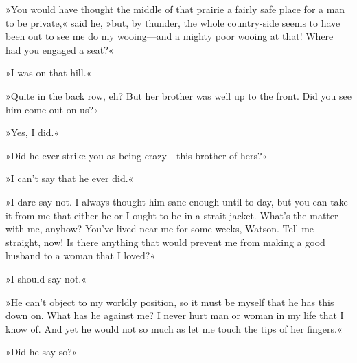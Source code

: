 »You would have thought the middle of that prairie a fairly safe place for a man to be private,« said he, »but, by thunder, the whole country-side seems to have been out to see me do my wooing\allowbreak---\allowbreak and a mighty poor wooing at that! Where had you engaged a seat?«

»I was on that hill.«

»Quite in the back row, eh? But her brother was well up to the front. Did you see him come out on us?«

»Yes, I did.«

»Did he ever strike you as being crazy\allowbreak---\allowbreak this brother of hers?«

»I can't say that he ever did.«

»I dare say not. I always thought him sane enough until to-day, but you can take it from me that either he or I ought to be in a strait-jacket. What's the matter with me, anyhow? You've lived near me for some weeks, Watson. Tell me straight, now! Is there anything that would prevent me from making a good husband to a woman that I loved?«

»I should say not.«

»He can't object to my worldly position, so it must be myself that he has this down on. What has he against me? I never hurt man or woman in my life that I know of. And yet he would not so much as let me touch the tips of her fingers.«

»Did he say so?«

